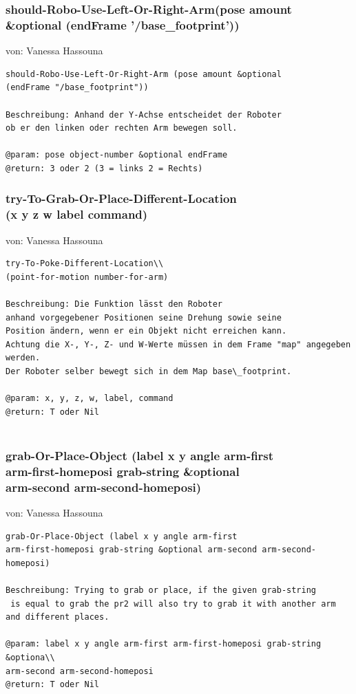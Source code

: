 \documentclass{suturo}
\makeatletter
\newcommand{\chapterauthor}[1]{%
  {\parindent0pt\vspace*{-27pt}%
  \linespread{0}\small\begin{flushright}von: #1\end{flushright}%
  \par\nobreak\vspace*{0pt}}
  \@afterheading%
}
\makeatother
\begin{document}
\subsubsection{should-Robo-Use-Left-Or-Right-Arm(pose amount \\
\&optional (endFrame '/base\_footprint'))}
\chapterauthor{Vanessa Hassouna}
\begin{verbatim}
should-Robo-Use-Left-Or-Right-Arm (pose amount &optional
(endFrame "/base_footprint"))

Beschreibung: Anhand der Y-Achse entscheidet der Roboter
ob er den linken oder rechten Arm bewegen soll.

@param: pose object-number &optional endFrame
@return: 3 oder 2 (3 = links 2 = Rechts)
\end{verbatim}

\subsubsection{ try-To-Grab-Or-Place-Different-Location\\
(x y z w label command)}
\chapterauthor{Vanessa Hassouna}
\begin{verbatim}
try-To-Poke-Different-Location\\
(point-for-motion number-for-arm)

Beschreibung: Die Funktion lässt den Roboter 
anhand vorgegebener Positionen seine Drehung sowie seine
Position ändern, wenn er ein Objekt nicht erreichen kann.
Achtung die X-, Y-, Z- und W-Werte müssen in dem Frame "map" angegeben werden.
Der Roboter selber bewegt sich in dem Map base\_footprint.

@param: x, y, z, w, label, command
@return: T oder Nil


\end{verbatim}

\subsubsection{  grab-Or-Place-Object (label x y angle arm-first \\
arm-first-homeposi grab-string \&optional \\
arm-second arm-second-homeposi)}
\chapterauthor{Vanessa Hassouna}
\begin{verbatim} 
grab-Or-Place-Object (label x y angle arm-first 
arm-first-homeposi grab-string &optional arm-second arm-second-homeposi)

Beschreibung: Trying to grab or place, if the given grab-string
 is equal to grab the pr2 will also try to grab it with another arm and different places.

@param: label x y angle arm-first arm-first-homeposi grab-string &optiona\\
arm-second arm-second-homeposi
@return: T oder Nil
\end{verbatim}
\end{document}
